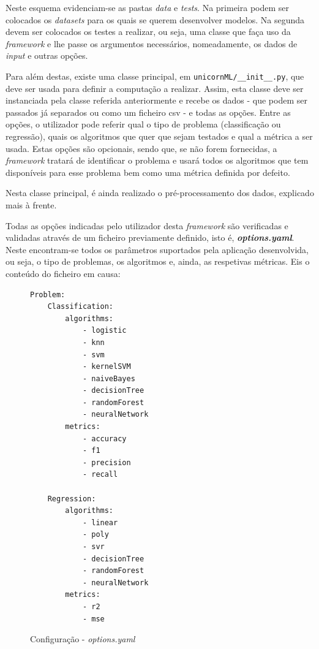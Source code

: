 \documentclass[a4paper]{report}
\begin{document}
{	Neste esquema evidenciam-se as pastas \textsl{data} e \textsl{tests}.
	Na primeira podem ser colocados os \textit{datasets} para os quais se querem desenvolver modelos.
	Na segunda devem ser colocados os testes a realizar, ou seja, uma classe que faça uso da \textit{framework} e lhe passe os argumentos necessários, nomeadamente, os dados de \textit{input} e outras opções.
	
	Para além destas, existe uma classe principal, em \texttt{unicornML/\_\_init\_\_.py}, que deve ser usada para definir a computação a realizar.
	Assim, esta classe deve ser instanciada pela classe referida anteriormente e recebe os dados - que podem ser passados já separados ou como um ficheiro csv - e todas as opções.
	Entre as opções, o utilizador pode referir qual o tipo de problema (classificação ou regressão), quais os algoritmos que quer que sejam testados e qual a métrica a ser usada.
	Estas opções são opcionais, sendo que, se não forem fornecidas, a \textit{framework} tratará de identificar o problema e usará todos os algoritmos que tem disponíveis para esse problema bem como uma métrica definida por defeito.

	Nesta classe principal, é ainda realizado o pré-processamento dos dados, explicado mais à frente.
    
    Todas as opções indicadas pelo utilizador desta \textit{framework} são verificadas e validadas através de um ficheiro previamente definido, isto é, \textbf{\textsl{options.yaml}}.
	Neste encontram-se todos os parâmetros suportados pela aplicação desenvolvida, ou seja, o tipo de problemas, os algoritmos e, ainda, as respetivas métricas.
	Eis o conteúdo do ficheiro em causa:
    \begin{figure}[H]
        \centering
        \begin{verbatim}
Problem:
    Classification:
        algorithms:
            - logistic
            - knn
            - svm
            - kernelSVM
            - naiveBayes
            - decisionTree
            - randomForest
            - neuralNetwork
        metrics:
            - accuracy
            - f1
            - precision
            - recall

    Regression:
        algorithms:
            - linear
            - poly
            - svr
            - decisionTree
            - randomForest
            - neuralNetwork
        metrics:
            - r2
            - mse
        \end{verbatim}
        \vspace{-5mm}
        \caption{Configuração - \textsl{options.yaml}}
        \label{fig:2}
	\end{figure}

}
\end{document}
